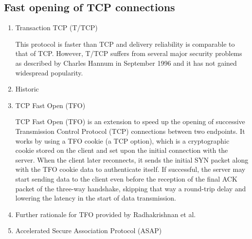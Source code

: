 \documentclass[twocolumn]{preport}
\begin{document}
\subsection{Fast opening of TCP connections}
\begin{enumerate}
\item Transaction TCP (T/TCP)\par
  This protocol is faster than TCP and delivery reliability is comparable to that of TCP. However, T/TCP suffers from several major security problems as described by Charles Hannum in September 1996 and it has not gained widespread popularity.
\item Historic\par
\item TCP Fast Open (TFO)\par
  TCP Fast Open (TFO) is an extension to speed up the opening of successive Transmission Control Protocol (TCP) connections between two endpoints. It works by using a TFO cookie (a TCP option), which is a cryptographic cookie stored on the client and set upon the initial connection with the server. When the client later reconnects, it sends the initial SYN packet along with the TFO cookie data to authenticate itself. If successful, the server may start sending data to the client even before the reception of the final ACK packet of the three-way handshake, skipping that way a round-trip delay and lowering the latency in the start of data transmission.
\item Further rationale for TFO provided by Radhakrishnan et al.\par
\item Accelerated Secure Association Protocol (ASAP)\par
\end{enumerate}
\end{document}
